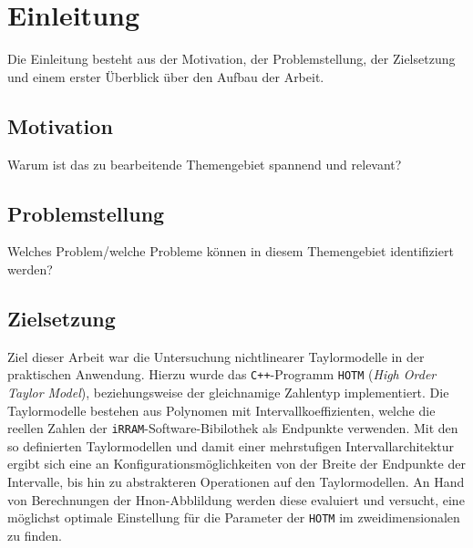 
\chapter{Einleitung}
\label{ch:Einleitung}
Die Einleitung besteht aus der Motivation, der Problemstellung, der Zielsetzung und einem erster Überblick über den Aufbau der Arbeit.

\section{Motivation}
\label{ch:Einleitung:sec:Motivation}

Warum ist das zu bearbeitende Themengebiet spannend und relevant?

\section{Problemstellung}
\label{ch:Einleitung:sec:Problemstellung}

Welches Problem/welche Probleme können in diesem Themengebiet identifiziert werden?

\section{Zielsetzung}
\label{ch:Einleitung:sec:Zielsetzung}

Ziel dieser Arbeit war die Untersuchung nichtlinearer Taylormodelle in der praktischen Anwendung. Hierzu wurde das \verb.C++.-Programm \verb+HOTM+ (\textit{High Order Taylor Model}), beziehungsweise der gleichnamige Zahlentyp implementiert. Die Taylormodelle bestehen aus Polynomen mit Intervallkoeffizienten, welche die reellen Zahlen der \verb+iRRAM+-Software-Bibilothek als Endpunkte verwenden. Mit den so definierten Taylormodellen und damit einer mehrstufigen Intervallarchitektur ergibt sich eine an Konfigurationsmöglichkeiten von der Breite der Endpunkte der Intervalle, bis hin zu abstrakteren Operationen auf den Taylormodellen. An Hand von Berechnungen der H\e non-Abblildung werden diese evaluiert und versucht, eine möglichst optimale Einstellung für die Parameter der \verb+HOTM+ im zweidimensionalen zu finden.

